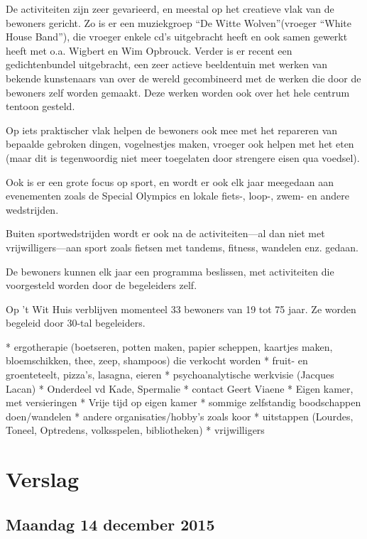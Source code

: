 \documentclass[a4paper,12pt]{article}
\begin{document}
De activiteiten zijn zeer gevarieerd, en meestal op het creatieve vlak van de bewoners gericht. Zo is er een muziekgroep ``De Witte Wolven''(vroeger ``White House Band''), die vroeger enkele cd's uitgebracht heeft en ook samen gewerkt heeft met o.a. Wigbert en Wim Opbrouck. Verder is er recent een gedichtenbundel uitgebracht, een zeer actieve beeldentuin met werken van bekende kunstenaars van over de wereld gecombineerd met de werken die door de bewoners zelf worden gemaakt. Deze werken worden ook over het hele centrum tentoon gesteld.

Op iets praktischer vlak helpen de bewoners ook mee met het repareren van bepaalde gebroken dingen, vogelnestjes maken, vroeger ook helpen met het eten (maar dit is tegenwoordig niet meer toegelaten door strengere eisen qua voedsel).

Ook is er een grote focus op sport, en wordt er ook elk jaar meegedaan aan evenementen zoals de Special Olympics en lokale fiets-, loop-, zwem- en andere wedstrijden.

Buiten sportwedstrijden wordt er ook na de activiteiten---al dan niet met vrijwilligers---aan sport zoals fietsen met tandems, fitness, wandelen enz. gedaan.

De bewoners kunnen elk jaar een programma beslissen, met activiteiten die voorgesteld worden door de begeleiders zelf.

Op 't Wit Huis verblijven momenteel 33 bewoners van 19 tot 75 jaar. Ze worden begeleid door 30-tal begeleiders.

* ergotherapie (boetseren, potten maken, papier scheppen, kaartjes maken, bloemschikken, thee, zeep, shampoos) die verkocht worden
* fruit- en groenteteelt, pizza's, lasagna, eieren
* psychoanalytische werkvisie (Jacques Lacan)
* Onderdeel vd Kade, Spermalie
* contact Geert Viaene
* Eigen kamer, met versieringen
* Vrije tijd op eigen kamer
* sommige zelfstandig boodschappen doen/wandelen
* andere organisaties/hobby's zoals koor
* uitstappen (Lourdes, Toneel, Optredens, volksspelen, bibliotheken)
* vrijwilligers

\section{Verslag}


\subsection{Maandag 14 december 2015}
\end{document}

